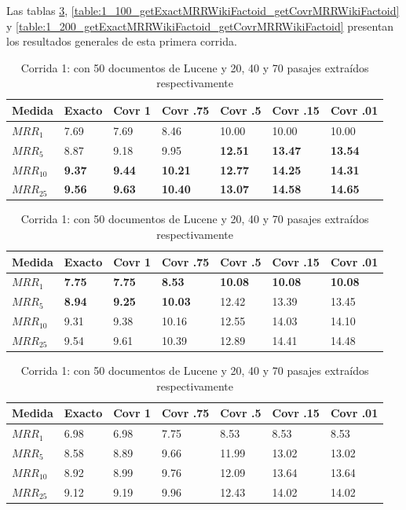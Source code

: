 Las tablas \ref{table:1_50_getExactMRRWikiFactoid_getCovrMRRWikiFactoid}, \ref{table:1_100_getExactMRRWikiFactoid_getCovrMRRWikiFactoid} y \ref{table:1_200_getExactMRRWikiFactoid_getCovrMRRWikiFactoid} presentan los resultados generales de esta primera corrida.

\begin{table}[H]
\centering
\begin{center}
\begin{tabular}{|l | l | l | l | l | l | l |}
\hline
Medida & Exacto & Covr 1 & Covr .75 & Covr .5 & Covr .15 & Covr .01 \\ \hline
$MRR_{1}$ & 7.69 & 7.69 & 8.46 & 10.00 & 10.00 & 10.00  \\ \hline
$MRR_{5}$ & 8.87 & 9.18 & 9.95 & \textbf{12.51} & \textbf{13.47} & \textbf{13.54}  \\ \hline
$MRR_{10}$ & \textbf{9.37} & \textbf{9.44} & \textbf{10.21} & \textbf{12.77} & \textbf{14.25} & \textbf{14.31}  \\ \hline
$MRR_{25}$ & \textbf{9.56} & \textbf{9.63} & \textbf{10.40} & \textbf{13.07} & \textbf{14.58} & \textbf{14.65}  \\ \hline
\end{tabular}

\medskip

\begin{tabular}{|l | l | l | l | l | l | l |}
\hline
Medida & Exacto & Covr 1 & Covr .75 & Covr .5 & Covr .15 & Covr .01 \\ \hline
$MRR_{1}$ & \textbf{7.75} & \textbf{7.75} & \textbf{8.53} & \textbf{10.08} & \textbf{10.08} & \textbf{10.08}  \\ \hline
$MRR_{5}$ & \textbf{8.94} & \textbf{9.25} & \textbf{10.03} & 12.42 & 13.39 & 13.45  \\ \hline
$MRR_{10}$ & 9.31 & 9.38 & 10.16 & 12.55 & 14.03 & 14.10  \\ \hline
$MRR_{25}$ & 9.54 & 9.61 & 10.39 & 12.89 & 14.41 & 14.48  \\ \hline
\end{tabular}

\medskip

\begin{tabular}{|l | l | l | l | l | l | l |}
\hline
Medida & Exacto & Covr 1 & Covr .75 & Covr .5 & Covr .15 & Covr .01 \\ \hline
$MRR_{1}$ & 6.98 & 6.98 & 7.75 & 8.53 & 8.53 & 8.53  \\ \hline
$MRR_{5}$ & 8.58 & 8.89 & 9.66 & 11.99 & 13.02 & 13.02  \\ \hline
$MRR_{10}$ & 8.92 & 8.99 & 9.76 & 12.09 & 13.64 & 13.64  \\ \hline
$MRR_{25}$ & 9.12 & 9.19 & 9.96 & 12.43 & 14.02 & 14.02  \\ \hline
\end{tabular}

\caption{Corrida 1: con 50 documentos de Lucene y 20, 40 y 70 pasajes extraídos respectivamente}
\label{table:1_50_getExactMRRWikiFactoid_getCovrMRRWikiFactoid}
\end{center}
\end{table}


